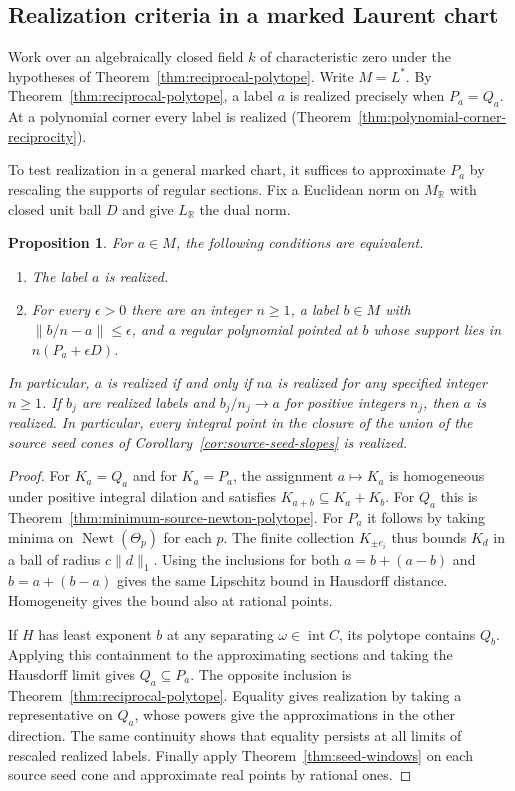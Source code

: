 \documentclass[11pt,reqno]{amsart}
\numberwithin{equation}{section}
\newtheorem{proposition}[theorem]{Proposition}
\theoremstyle{definition}
\theoremstyle{remark}
\DeclareMathOperator{\Newt}{Newt}
\begin{document}
\subsection{Realization criteria in a marked Laurent chart}

Work over an algebraically closed field \(k\) of characteristic zero
under the hypotheses of Theorem~\ref{thm:reciprocal-polytope}.
Write \(M=L^*\). By Theorem~\ref{thm:reciprocal-polytope},
a label \(a\) is realized precisely when \(P_a=Q_a\).
At a polynomial corner every label is realized
(Theorem~\ref{thm:polynomial-corner-reciprocity}).

To test realization in a general marked chart, it suffices to
approximate \(P_a\) by rescaling the supports of regular sections.
Fix a Euclidean norm on \(M_{\mathbb R}\) with closed unit ball \(D\)
and give \(L_{\mathbb R}\) the dual norm.

\begin{proposition}\label{prop:cartier-closure}
For \(a\in M\), the following conditions are equivalent.
\begin{enumerate}
\item The label \(a\) is realized.
\item For every \(\epsilon>0\) there are an integer \(n\ge1\),
      a label \(b\in M\) with \(\|b/n-a\|\le\epsilon\), and a
      regular polynomial pointed at \(b\) whose support lies in
      \(n(P_a+\epsilon D)\).
\end{enumerate}
In particular, \(a\) is realized if and only if \(na\) is realized
for any specified integer \(n\ge1\). If \(b_j\) are realized labels and
\(b_j/n_j\to a\) for positive integers \(n_j\), then \(a\) is
realized.
In particular, every integral point in the closure of the union of the source seed
cones of Corollary~\ref{cor:source-seed-slopes} is realized.
\end{proposition}

\begin{proof}
For \(K_a=Q_a\) and for \(K_a=P_a\), the assignment \(a\mapsto K_a\)
is homogeneous under positive integral dilation and satisfies
\(K_{a+b}\subseteq K_a+K_b\). For \(Q_a\) this is
Theorem~\ref{thm:minimum-source-newton-polytope}. For \(P_a\)
it follows by taking minima on \(\Newt(\Theta_p)\) for each \(p\).
The finite collection \(K_{\pm e_i}\) thus bounds \(K_d\) in a
ball of radius \(c\|d\|_1\). Using the inclusions for both
\(a=b+(a-b)\) and \(b=a+(b-a)\) gives the same Lipschitz bound
in Hausdorff distance. Homogeneity gives the bound also at rational
points.

If \(H\) has least exponent \(b\) at any separating
\(\omega\in\operatorname{int}C\), its polytope contains \(Q_b\).
Applying this containment to the approximating sections and taking
the Hausdorff limit gives \(Q_a\subseteq P_a\). The opposite inclusion is
Theorem~\ref{thm:reciprocal-polytope}. Equality gives realization
by taking a representative on \(Q_a\), whose powers give the
approximations in the other direction. The same continuity shows
that equality persists at all limits of rescaled realized labels.
Finally apply Theorem~\ref{thm:seed-windows} on each source seed
cone and approximate real points by rational ones.
\end{proof}
\end{document}
